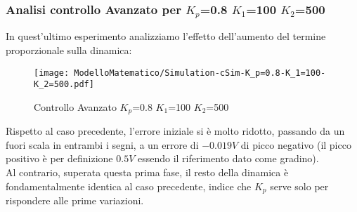 \subsubsection{Analisi controllo Avanzato per $ K_p $=0.8 $ K_1 $=100 $ K_2 $=500}
In quest'ultimo esperimento analizziamo l'effetto dell'aumento del termine proporzionale sulla dinamica:
\begin{figure}[H]
	\centering
	\caption[Controllo Avanzato $ K_p $=0.8 $ K_1 $=100 $ K_2 $=500]{Controllo Avanzato $ K_p $=0.8 $ K_1 $=100 $ K_2 $=500}
	\texttt{[image: ModelloMatematico/Simulation-cSim-K\_p=0.8-K\_1=100-K\_2=500.pdf]}
\end{figure}
\noindent
Rispetto al caso precedente, l'errore iniziale si è molto ridotto, passando da un fuori scala in entrambi i segni, a un errore di $ -0.019V $ di picco negativo (il picco positivo è per definizione $ 0.5V $ essendo il riferimento dato come gradino).\\
Al contrario, superata questa prima fase, il resto della dinamica è fondamentalmente identica al caso precedente, indice che $ K_p $ serve solo per rispondere alle prime variazioni.

\newpage

